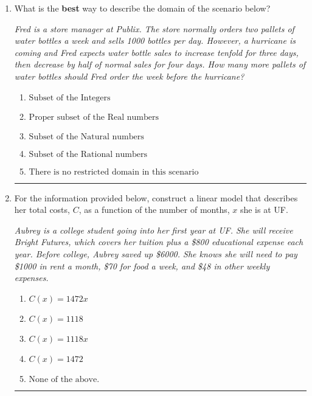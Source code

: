 \documentclass[14pt]{extbook}
\newcommand{\litem}[1]{\item#1\hspace*{-1cm}\rule{\textwidth}{0.4pt}}
\begin{document}
\begin{enumerate}
{\begin{enumerate}[label=\Alph*.]
\end{enumerate} }
\litem{
What is the \textbf{best} way to describe the domain of the scenario below?
\begin{center}
    \textit{ Fred is a store manager at Publix. The store normally orders two pallets of water bottles a week and sells 1000 bottles per day. However, a hurricane is coming and Fred expects water bottle sales to increase tenfold for three days, then decrease by half of normal sales for four days. How many more pallets of water bottles should Fred order the week before the hurricane? }
\end{center}
\begin{enumerate}[label=\Alph*.]
\item \( \text{Subset of the Integers} \)
\item \( \text{Proper subset of the Real numbers} \)
\item \( \text{Subset of the Natural numbers} \)
\item \( \text{Subset of the Rational numbers} \)
\item \( \text{There is no restricted domain in this scenario} \)

\end{enumerate} }
\litem{
For the information provided below, construct a linear model that describes her total costs, $C$, as a function of the number of months, $x$ she is at UF. 
\begin{center}
    \textit{ Aubrey is a college student going into her first year at UF. She will receive Bright Futures, which covers her tuition plus a \$800 educational expense each year. Before college, Aubrey saved up \$6000. She knows she will need to pay \$1000 in rent a month, \$70 for food a week, and \$48 in other weekly expenses. }
\end{center}
\begin{enumerate}[label=\Alph*.]
\item \( C(x) = 1472 x \)
\item \( C(x) = 1118 \)
\item \( C(x) = 1118 x \)
\item \( C(x) = 1472 \)
\item \( \text{None of the above.} \)


\end{enumerate}}
\end{enumerate}
\end{document}
